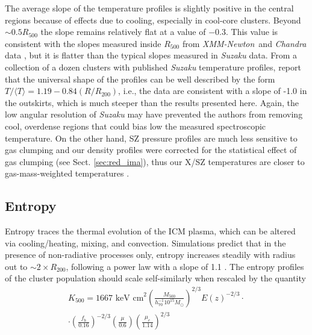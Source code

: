 \documentclass[traditabstract   ]{aa} %
\newcommand{\xmm}{{\it XMM-Newton}}
\begin{document}
The average slope of the temperature profiles is slightly positive in the central regions because of effects due to cooling, especially in cool-core clusters. Beyond $\sim0.5R_{500}$ the slope remains relatively flat at a value of $-0.3$. This value is consistent with the slopes measured inside $R_{500}$ from \xmm\ and \emph{Chandra} data \citep{lm08,pratt07}, but it is flatter than the typical slopes measured in \emph{Suzaku} data. From a collection of a dozen clusters with published \emph{Suzaku} temperature profiles, \citet{reiprich13} report that the universal shape of the profiles can be well described by the form $T/\langle T\rangle=1.19-0.84(R/R_{200})$, i.e., the data are consistent with a slope of -1.0 in the outskirts, which is much steeper than the results presented here. Again, the low angular resolution of \emph{Suzaku} may have prevented the authors from removing cool, overdense regions that could bias low the measured spectroscopic temperature. On the other hand, SZ pressure profiles are much less sensitive to gas clumping \citep[e.g.,][]{khedekar13,roncarelli+13} and our density profiles were corrected for the statistical effect of gas clumping (see Sect. \ref{sec:red_ima}), thus our X/SZ temperatures are closer to gas-mass-weighted temperatures \citep[see the discussion in][]{adam17}.


\subsection{Entropy}
\label{sec:entropy}

Entropy  traces the thermal evolution of the ICM plasma, which can be altered via cooling/heating, mixing, and convection.
Simulations predict that in the presence of non-radiative processes only, entropy increases steadily with radius out to $\sim2\times R_{200}$, following a power law with a slope of 1.1 \citep{tozzi01,voit+05,borgani05,lau15}. The entropy profiles of the cluster population should scale self-similarly when rescaled by the quantity
\begin{multline}
K_{500} = 1667 \text{\ keV cm}^2 \left(\frac{ M_{500} }{ h_{70}^{-1} 10^{15} M_\odot } \right)^{2/3} E(z)^{-2/3} \cdot \\ \cdot \left(\frac{f_b}{0.16} \right)^{-2/3} \left( \frac{\mu}{0.6} \right) \left( \frac{\mu_e}{1.14} \right)^{2/3}
\label{eq:K500}
\end{multline}
\end{document}
